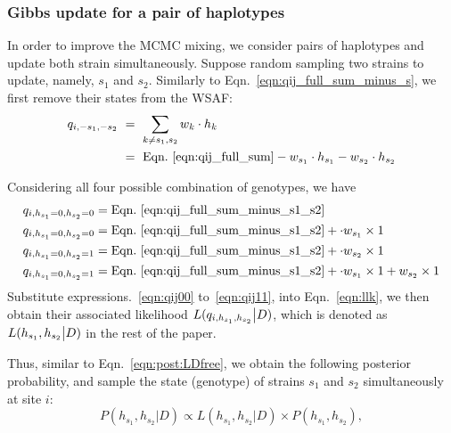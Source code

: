 \documentclass{bioinfo}
\begin{document}
\subsubsection{Gibbs update for a pair of haplotypes}\label{sec:deconvolute}
In order to improve the MCMC mixing, we consider pairs of haplotypes and update both strain simultaneously. Suppose random sampling two strains to update, namely, $s_1$ and $s_2$. Similarly to Eqn.~\eqref{eqn:qij_full_sum_minus_s}, we first remove their states from the WSAF:
\begin{equation}
\begin{split}
q_{i,-s_1, -s_2} & ~ = ~ \sum_{k\neq s_1,s_2} w_k \cdot h_k \\
                 & ~ = ~ \textrm{Eqn.~\eqref{eqn:qij_full_sum}} - w_{s_1} \cdot h_{s_1} - w_{s_2} \cdot h_{s_2} \label{eqn:qij_full_sum_minus_s1_s2}
\end{split}
\end{equation}

Considering all four possible combination of genotypes, we have
\begin{align}
q_{i,h_{s_1}=0,h_{s_2}=0} & = \textrm{Eqn.~\eqref{eqn:qij_full_sum_minus_s1_s2}} \label{eqn:qij00}\\
q_{i,h_{s_1}=0,h_{s_2}=0} & = \textrm{Eqn.~\eqref{eqn:qij_full_sum_minus_s1_s2}} + \cdot w_{s_1} \times 1 \label{eqn:qij10}\\
q_{i,h_{s_1}=0,h_{s_2}=1} & = \textrm{Eqn.~\eqref{eqn:qij_full_sum_minus_s1_s2}} + \cdot w_{s_2} \times 1 \label{eqn:qij01}\\
q_{i,h_{s_1}=0,h_{s_2}=1} & = \textrm{Eqn.~\eqref{eqn:qij_full_sum_minus_s1_s2}} + \cdot w_{s_1} \times 1 + w_{s_2} \times 1 \label{eqn:qij11}
\end{align}
Substitute expressions.~\eqref{eqn:qij00} to~\eqref{eqn:qij11}, into Eqn.~\eqref{eqn:llk}, we then obtain their associated likelihood $L(q_{i,h_{s_1},h_{s_2}} \big{|} D)$, which is denoted as $L(h_{s_1},h_{s_2} \big{|} D)$ in the rest of the paper.

Thus, similar to Eqn.~\eqref{eqn:post:LDfree}, we obtain the following posterior probability, and sample the state (genotype) of strains $s_1$ and $s_2$ simultaneously at site $i$:
\begin{equation}
P(h_{s_1},h_{s_2} | D) \propto L(h_{s_1},h_{s_2} |D) \times P(h_{s_1},h_{s_2} ),\label{eqn:post.two:LDfree}
\end{equation}
\end{document}
